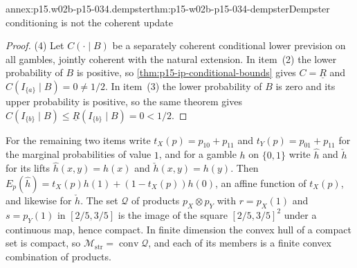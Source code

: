 \begin{annexitem}{annex:p15.w02b-p15-034.dempster}{thm:p15-w02b-p15-034-dempster}{Dempster conditioning is not the coherent update}
\begin{proof}
(4) Let \(C(\cdot\mid B)\) be a separately coherent conditional lower
prevision on all gambles, jointly coherent with the natural extension. In
item~(2) the lower probability of \(B\) is positive, so
\cref{thm:p15-ip-conditional-bounds} gives \(C=\underline R\) and
\(C(I_{\{a\}}\mid B)=0\ne1/2\). In item~(3) the lower probability of \(B\)
is zero and its upper probability is positive, so the same theorem gives
\(C(I_{\{b\}}\mid B)\leq\underline R(I_{\{b\}}\mid B)=0<1/2\).
\end{proof}
\end{annexitem}

For the remaining two items write \(t_X(p)=p_{10}+p_{11}\) and
\(t_Y(p)=p_{01}+p_{11}\) for the marginal probabilities of value \(1\), and
for a gamble \(h\) on \(\{0,1\}\) write \(\hat h\) and \(\check h\) for
its lifts \(\hat h(x,y)=h(x)\) and \(\check h(x,y)=h(y)\). Then
\(E_p(\hat h)=t_X(p)h(1)+(1-t_X(p))h(0)\), an affine function of
\(t_X(p)\), and likewise for \(\check h\). The set \(\mathcal Q\) of
products \(p_X\otimes p_Y\) with \(r=p_X(1)\) and \(s=p_Y(1)\) in
\([2/5,3/5]\) is the image of the square \([2/5,3/5]^2\) under a
continuous map, hence compact. In finite dimension the convex hull of a
compact set is compact, so \(\mathcal M_{\mathrm{str}}=\operatorname{conv}
\mathcal Q\), and each of its members is a finite convex combination of
products.

